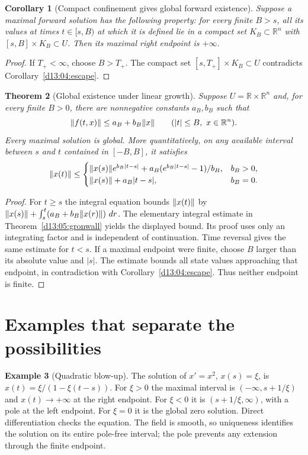 \documentclass[11pt,oneside]{book}
\newtheorem{theorem}{Theorem}[chapter]
\newtheorem{corollary}[theorem]{Corollary}
\theoremstyle{definition}
\newtheorem{example}[theorem]{Example}
\theoremstyle{remark}\newtheorem{remark}[theorem]{Remark}
\newcommand{\R}{\mathbb R}\newcommand{\C}{\mathbb C}
\newcommand{\dd}{\,d}\newcommand{\id}{\operatorname{id}}
\begin{document}
\begin{corollary}[Compact confinement gives global forward existence]\label{d13:04:confinement}
Suppose a maximal forward solution has the following property: for every finite
$B>s$, all its values at times $t\in[s,B)$ at which it is defined lie
in a compact set $K_B\subset\R^n$ with $[s,B]\times K_B\subset U$.
Then its maximal right endpoint is $+\infty$.
\end{corollary}
\begin{proof}
If $T_+<\infty$, choose $B>T_+$. The compact set
$[s,T_+]\times K_B\subset U$ contradicts
Corollary~\ref{d13:04:escape}.
\end{proof}

\begin{theorem}[Global existence under linear growth]\label{d13:04:linear-growth}
Suppose $U=\R\times\R^n$ and, for every finite $B>0$, there are
nonnegative constants $a_B,b_B$ such that
\[
 \norm{f(t,x)}\leq a_B+b_B\norm{x}
 \qquad(|t|\leq B,\ x\in\R^n).
\]
Every maximal solution is global. More quantitatively, on any available
interval between $s$ and $t$ contained in $[-B,B]$, it satisfies
\[
 \lVert x(t)\rVert\leq
 \begin{cases}
 \lVert x(s)\rVert e^{b_B|t-s|}
       +a_B(e^{b_B|t-s|}-1)/b_B,&b_B>0,\\
 \lVert x(s)\rVert+a_B|t-s|,&b_B=0.
 \end{cases}
\]
\end{theorem}
\begin{proof}
For $t\geq s$ the integral equation bounds $\lVert x(t)\rVert$ by
$\norm{x(s)}+\int_s^t(a_B+b_B\norm{x(r)})\,\dd r$.
The elementary integral estimate in
Theorem~\ref{d13:05:gronwall} yields the displayed bound. Its proof
uses only an integrating factor and is independent of continuation.
Time reversal gives the same estimate for $t<s$. If a maximal endpoint
were finite, choose $B$ larger than its absolute value and $|s|$. The
estimate bounds all state values approaching that endpoint, in
contradiction with Corollary~\ref{d13:04:escape}. Thus neither endpoint
is finite.
\end{proof}

\section{Examples that separate the possibilities}
\begin{example}[Quadratic blow-up]\label{d13:04:quadratic-blowup}
The solution of $x'=x^2$, $x(s)=\xi$, is
$x(t)=\xi/(1-\xi(t-s))$. For $\xi>0$ the maximal interval is
$(-\infty,s+1/\xi)$ and $x(t)\to+\infty$ at the right endpoint.
For $\xi<0$ it is $(s+1/\xi,\infty)$, with a pole at the left
endpoint. For $\xi=0$ it is the global zero solution. Direct
differentiation checks the equation. The field is smooth, so uniqueness
identifies the solution on its entire pole-free interval; the pole
prevents any extension through the finite endpoint.
\end{example}
\end{document}
